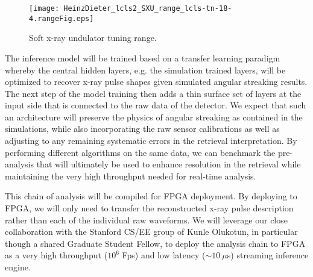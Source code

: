 \begin{wrapfigure}[18]{r}{3.5in}
\vspace{-1\baselineskip}
\centerline{
	\texttt{[image: HeinzDieter\_lcls2\_SXU\_range\_lcls-tn-18-4.rangeFig.eps]}
	}
\vspace{-1\baselineskip}
\caption{\label{fig::sxu_K} Soft x-ray undulator tuning range. \cite{HeinzDieter_SXU_twocolor}
	}
\end{wrapfigure}

The inference model will be trained based on a transfer learning paradigm whereby the central hidden layers, e.g. the simulation trained layers, will be optimized to recover x-ray pulse shapes given simulated angular streaking results.
The next step of the model training then adds a thin surface set of layers at the input side that is connected to the raw data of the detector.
We expect that such an architecture will preserve the physics of angular streaking as contained in the simulations, while also incorporating the raw sensor calibrations as well as adjusting to any remaining systematic errors in the retrieval interpretation.
By performing different algorithms on the same data, we can benchmark the pre-analysis that will ultimately be used to enhance resolution in the retrieval while maintaining the very high throughput needed for real-time analysis.

This chain of analysis will be compiled for FPGA deployment.  
By deploying to FPGA, we will only need to transfer the reconstructed x-ray pulse description rather than each of the individual raw waveforms. 
We will leverage our close collaboration with the Stanford CS/EE group of Kunle Olukotun, in particular though a shared Graduate Student Fellow, to deploy the analysis chain to FPGA as a very high throughput ($10^6$ Fps) and low latency ($\sim10~\mu$s) streaming inference engine.

